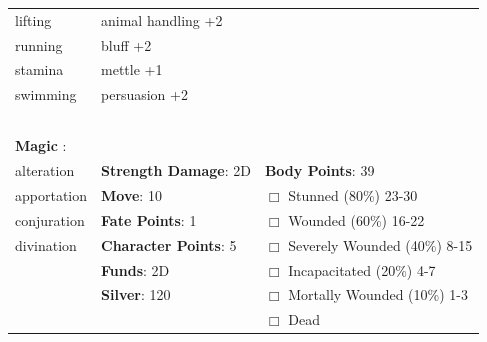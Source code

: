 \documentclass[10pt]{article}
\begin{document}
\begin{table}
\begin{tabular}{m{156pt} m{156pt} m{156pt}}
lifting              \hrulefill & animal handling   +2 \hrulefill &  \hrulefill \\

running              \hrulefill & bluff             +2 \hrulefill &  \hrulefill \\

stamina              \hrulefill & mettle            +1 \hrulefill &  \hrulefill \\

swimming             \hrulefill & persuasion        +2 \hrulefill &  \hrulefill \\

 \hrulefill &  \hrulefill &  \hrulefill \\

 \hrulefill &  \hrulefill &  \hrulefill \\

 \hrulefill &  \hrulefill &  \hrulefill \\

 \hrulefill &  \hrulefill &  \hrulefill \\

                                  &                                 &                             \\
\textbf{Magic }:  \hrulefill  &                                 &                             \\
alteration           \hrulefill & \textbf{Strength Damage}: 2D \hrulefill                             & \textbf{Body Points}: 39 \hrulefill \\
apportation          \hrulefill                        & \textbf{Move}:             10             \hrulefill    & $\Box$ Stunned \footnotesize{(80\%)} \hfill 23-30 \\
conjuration          \hrulefill                        & \textbf{Fate Points}:      1      \hrulefill    & $\Box$ Wounded \footnotesize{(60\%)} \hfill 16-22 \\
divination           \hrulefill                        & \textbf{Character Points}: 5 \hrulefill    & $\Box$ Severely Wounded \footnotesize{(40\%)} \hfill 8-15 \\
 \hrulefill                        & \textbf{Funds}:            2D            \hrulefill    & $\Box$ Incapacitated \footnotesize{(20\%)} \hfill 4-7 \\
 \hrulefill                        & \textbf{Silver}:           120           \hrulefill    & $\Box$ Mortally Wounded \footnotesize{(10\%)} \hfill 1-3 \\
 \hrulefill                        &  \hrulefill                                                       & $\Box$ Dead   \\
\end{tabular}
\end{table}
\cleardoublepage
\end{document}
